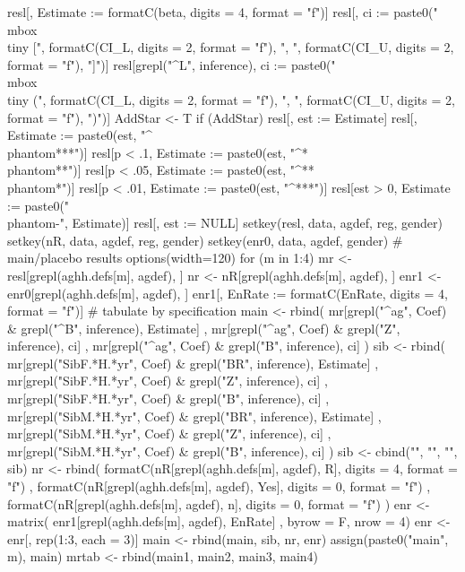 \begin{Schunk}
\begin{Sinput}
resl[, Estimate := formatC(beta, digits = 4, format = "f")]
resl[, ci := paste0("\\mbox{\\tiny [", 
  formatC(CI_L, digits = 2, format = "f"), ", ", 
  formatC(CI_U, digits = 2, format = "f"), "]}")]
resl[grepl("^L", inference), ci := paste0("\\mbox{\\tiny (", 
  formatC(CI_L, digits = 2, format = "f"), ", ", 
  formatC(CI_U, digits = 2, format = "f"), ")}")]
AddStar <- T
if (AddStar) {
  resl[, est := Estimate]
  resl[, Estimate := paste0(est, "^{\\phantom{***}}")]
  resl[p < .1, Estimate := paste0(est, "^{*\\phantom{**}}")]
  resl[p < .05, Estimate := paste0(est, "^{**\\phantom{*}}")]
  resl[p < .01, Estimate := paste0(est, "^{***}")]
  resl[est > 0, Estimate := paste0("\\phantom{-}", Estimate)]
  resl[, est := NULL]
}
setkey(resl, data, agdef, reg, gender)
setkey(nR, data, agdef, reg, gender)
setkey(enr0, data, agdef, gender)
# main/placebo results
options(width=120)
for (m in 1:4) {
  mr <- resl[grepl(aghh.defs[m], agdef), ]
  nr <- nR[grepl(aghh.defs[m], agdef), ]
  enr1 <- enr0[grepl(aghh.defs[m], agdef), ]
  enr1[, EnRate := formatC(EnRate, digits = 4, format = "f")]
  # tabulate by specification
  main <- rbind(
    mr[grepl("^ag", Coef) & grepl("^B", inference), Estimate]
    ,
    mr[grepl("^ag", Coef) & grepl("Z", inference), ci]
    ,
    mr[grepl("^ag", Coef) & grepl("B", inference), ci]
  )
  sib <-  rbind(
     mr[grepl("SibF.*H.*yr", Coef) & grepl("BR", inference), Estimate]
     , 
     mr[grepl("SibF.*H.*yr", Coef) & grepl("Z", inference), ci]
     ,
     mr[grepl("SibF.*H.*yr", Coef) & grepl("B", inference), ci]
     ,
     mr[grepl("SibM.*H.*yr", Coef) & grepl("BR", inference), Estimate]
     , 
     mr[grepl("SibM.*H.*yr", Coef) & grepl("Z", inference), ci]
     ,
     mr[grepl("SibM.*H.*yr", Coef) & grepl("B", inference), ci]
   )
   sib <- cbind("", "", "", sib)
   nr <- rbind(
      formatC(nR[grepl(aghh.defs[m], agdef), R], digits = 4, format = "f")
    , formatC(nR[grepl(aghh.defs[m], agdef), Yes], digits = 0, format = "f")
    , formatC(nR[grepl(aghh.defs[m], agdef), n], digits = 0, format = "f")
   )
   enr <- matrix(
     enr1[grepl(aghh.defs[m], agdef), EnRate]
     , byrow = F, nrow = 4)
   enr <- enr[, rep(1:3, each = 3)]
   main <- rbind(main, sib, nr, enr)
   assign(paste0("main", m), main)
}
mrtab <- rbind(main1, main2, main3, main4)

\end{Sinput}
\end{Schunk}
